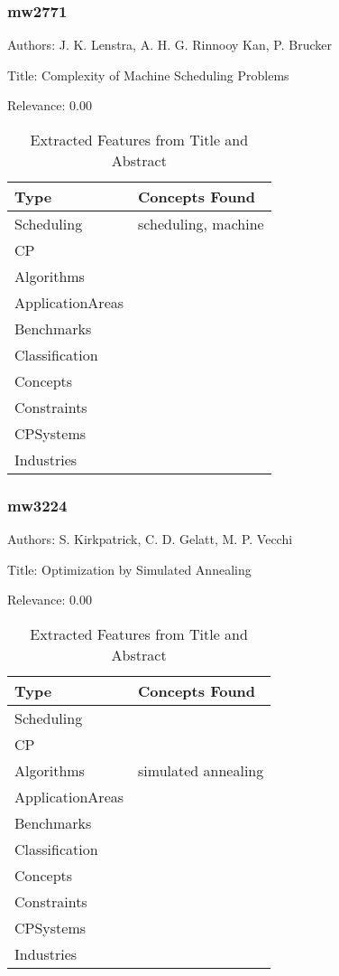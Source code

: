 \subsubsection{mw2771}
\label{mw:mw2771}

Authors: J. K. Lenstra, A. H. G. Rinnooy Kan, P. Brucker

Title: Complexity of Machine Scheduling Problems

Relevance:  0.00

{\scriptsize
\begin{longtable}{p{2cm}p{20cm}}
\caption{Extracted Features from Title and Abstract}\\ \toprule
Type & Concepts Found\\ \midrule
\endhead
\bottomrule
\endfoot
Scheduling & scheduling, machine\\ 
CP & \\ 
Algorithms & \\ 
ApplicationAreas & \\ 
Benchmarks & \\ 
Classification & \\ 
Concepts & \\ 
Constraints & \\ 
CPSystems & \\ 
Industries & \\ 
\end{longtable}
}



\subsubsection{mw3224}
\label{mw:mw3224}

Authors: S. Kirkpatrick, C. D. Gelatt, M. P. Vecchi

Title: Optimization by Simulated Annealing

Relevance:  0.00

{\scriptsize
\begin{longtable}{p{2cm}p{20cm}}
\caption{Extracted Features from Title and Abstract}\\ \toprule
Type & Concepts Found\\ \midrule
\endhead
\bottomrule
\endfoot
Scheduling & \\ 
CP & \\ 
Algorithms & simulated annealing\\ 
ApplicationAreas & \\ 
Benchmarks & \\ 
Classification & \\ 
Concepts & \\ 
Constraints & \\ 
CPSystems & \\ 
Industries & \\ 
\end{longtable}
}


